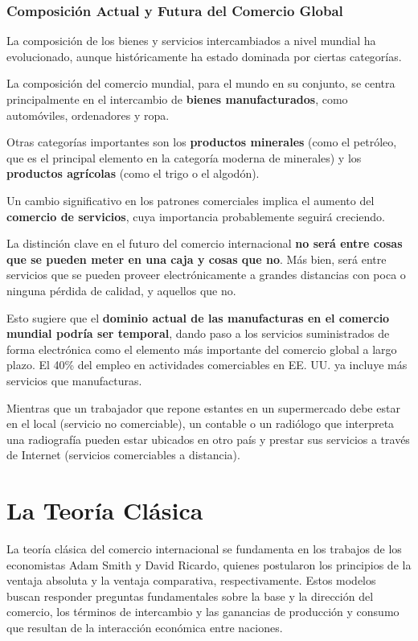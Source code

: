 \subsubsection{Composición Actual y Futura del Comercio Global}
La composición de los bienes y servicios intercambiados a nivel mundial ha evolucionado, aunque históricamente ha estado dominada por ciertas categorías.

\begin{definicion}
La composición del comercio mundial, para el mundo en su conjunto, se centra principalmente en el intercambio de \textbf{bienes manufacturados}, como automóviles, ordenadores y ropa.
\end{definicion}

Otras categorías importantes son los \textbf{productos minerales} (como el petróleo, que es el principal elemento en la categoría moderna de minerales) y los \textbf{productos agrícolas} (como el trigo o el algodón).

Un cambio significativo en los patrones comerciales implica el aumento del \textbf{comercio de servicios}, cuya importancia probablemente seguirá creciendo.

\begin{proposicion}
La distinción clave en el futuro del comercio internacional \textbf{no será entre cosas que se pueden meter en una caja y cosas que no}. Más bien, será entre servicios que se pueden proveer electrónicamente a grandes distancias con poca o ninguna pérdida de calidad, y aquellos que no.
\end{proposicion}

Esto sugiere que el \textbf{dominio actual de las manufacturas en el comercio mundial podría ser temporal}, dando paso a los servicios suministrados de forma electrónica como el elemento más importante del comercio global a largo plazo. El 40\% del empleo en actividades comerciables en EE. UU. ya incluye más servicios que manufacturas.

\begin{ejemplo}
Mientras que un trabajador que repone estantes en un supermercado debe estar en el local (servicio no comerciable), un contable o un radiólogo que interpreta una radiografía pueden estar ubicados en otro país y prestar sus servicios a través de Internet (servicios comerciables a distancia).
\end{ejemplo}


\section{La Teoría Clásica}
La teoría clásica del comercio internacional se fundamenta en los trabajos de los economistas Adam Smith y David Ricardo, quienes postularon los principios de la ventaja absoluta y la ventaja comparativa, respectivamente. Estos modelos buscan responder preguntas fundamentales sobre la base y la dirección del comercio, los términos de intercambio y las ganancias de producción y consumo que resultan de la interacción económica entre naciones.


